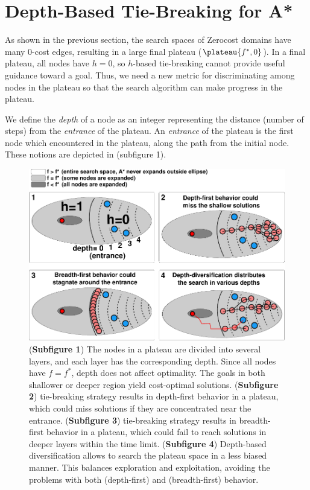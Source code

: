 \section{Depth-Based Tie-Breaking for A*}

\label{sec:depth}

As shown in the previous section, the search spaces of Zerocost domains have many 0-cost edges,
resulting in a large final plateau ($\plateau{f^*,0}$). In a final plateau,
all nodes have $h=0$, so $h$-based tie-breaking cannot provide
useful guidance toward a goal. Thus, we need a new metric for discriminating among nodes
in the plateau so that the search algorithm can make progress in the plateau.

We define the \emph{depth} of a node as an 
integer representing the distance (number of steps) from the
\emph{entrance} of the plateau.  An \emph{entrance} of the plateau is
the first node which encountered in the plateau, along the path from the
initial node. These notions are depicted in
 (subfigure 1). 

\begin{figure}[htbp]
  \centering
  \includegraphics{img/astar/plateau-2.pdf}
 \caption{(\textbf{Subfigure 1}) The nodes in a plateau are divided into several layers, and each layer has the corresponding depth. Since all nodes have $f=f^*$, depth does not affect optimality. The goals in both shallower or deeper region yield cost-optimal solutions.
 (\textbf{Subfigure 2}) \lifo tie-breaking strategy results in depth-first behavior in a
 plateau, which could miss solutions if they are concentrated near the entrance.
 (\textbf{Subfigure 3}) \fifo tie-breaking strategy results in  breadth-first behavior in a
 plateau, which could fail to reach solutions in deeper layers within the time limit.
 (\textbf{Subfigure 4}) Depth-based diversification allows \astar to search the plateau space
 in a less biased manner. This balances exploration and exploitation, avoiding the problems with both \lifo (depth-first) and \fifo (breadth-first) behavior.
 }
 \label{fig:plateau-depiction}
\end{figure}

